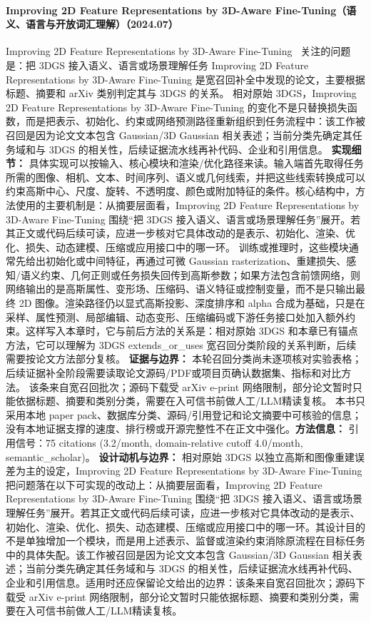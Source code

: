 \paragraph{Improving 2D Feature Representations by 3D-Aware Fine-Tuning（语义、语言与开放词汇理解）（2024.07）}
Improving 2D Feature Representations by 3D-Aware Fine-Tuning~\cite{2407_20229} 关注的问题是：把 3DGS 接入语义、语言或场景理解任务 Improving 2D Feature Representations by 3D-Aware Fine-Tuning 是宽召回补全中发现的论文，主要根据标题、摘要和 arXiv 类别判定其与 3DGS 的关系。
相对原始 3DGS，Improving 2D Feature Representations by 3D-Aware Fine-Tuning 的变化不是只替换损失函数，而是把表示、初始化、约束或网络预测路径重新组织到任务流程中：该工作被召回是因为论文文本包含 Gaussian/3D Gaussian 相关表述；当前分类先确定其任务域和与 3DGS 的相关性，后续证据流水线再补代码、企业和引用信息。
\textbf{实现细节：} 具体实现可以按输入、核心模块和渲染/优化路径来读。输入端首先取得任务所需的图像、相机、文本、时间序列、语义或几何线索，并把这些线索转换成可以约束高斯中心、尺度、旋转、不透明度、颜色或附加特征的条件。核心结构中，方法使用的主要机制是：从摘要层面看，Improving 2D Feature Representations by 3D-Aware Fine-Tuning 围绕“把 3DGS 接入语义、语言或场景理解任务”展开。若其正文或代码后续可读，应进一步核对它具体改动的是表示、初始化、渲染、优化、损失、动态建模、压缩或应用接口中的哪一环。 训练或推理时，这些模块通常先给出初始化或中间特征，再通过可微 Gaussian rasterization、重建损失、感知/语义约束、几何正则或任务损失回传到高斯参数；如果方法包含前馈网络，则网络输出的是高斯属性、变形场、压缩码、语义特征或控制变量，而不是只输出最终 2D 图像。渲染路径仍以显式高斯投影、深度排序和 alpha 合成为基础，只是在采样、属性预测、局部编辑、动态变形、压缩编码或下游任务接口处加入额外约束。这样写入本章时，它与前后方法的关系是：相对原始 3DGS 和本章已有锚点方法，它可以理解为 3DGS extends\_or\_uses 宽召回分类阶段的关系判断，后续需要按论文方法部分复核。
\textbf{证据与边界：} 本轮召回分类尚未逐项核对实验表格；后续证据补全阶段需要读取论文源码/PDF或项目页确认数据集、指标和对比方法。 该条来自宽召回批次；源码下载受 arXiv e-print 网络限制，部分论文暂时只能依据标题、摘要和类别分类，需要在入可信书前做人工/LLM精读复核。 本书只采用本地 paper pack、数据库分类、源码/引用登记和论文摘要中可核验的信息；没有本地证据支撑的速度、排行榜或开源完整性不在正文中强化。\textbf{方法信息：} 引用信号：75 citations (3.2/month, domain-relative cutoff 4.0/month, semantic\_scholar)。
\textbf{设计动机与边界：} 相对原始 3DGS 以独立高斯和图像重建误差为主的设定，Improving 2D Feature Representations by 3D-Aware Fine-Tuning 把问题落在以下可实现的改动上：从摘要层面看，Improving 2D Feature Representations by 3D-Aware Fine-Tuning 围绕“把 3DGS 接入语义、语言或场景理解任务”展开。若其正文或代码后续可读，应进一步核对它具体改动的是表示、初始化、渲染、优化、损失、动态建模、压缩或应用接口中的哪一环。其设计目的不是单独增加一个模块，而是用上述表示、监督或渲染约束消除原流程在目标任务中的具体失配。该工作被召回是因为论文文本包含 Gaussian/3D Gaussian 相关表述；当前分类先确定其任务域和与 3DGS 的相关性，后续证据流水线再补代码、企业和引用信息。适用时还应保留论文给出的边界：该条来自宽召回批次；源码下载受 arXiv e-print 网络限制，部分论文暂时只能依据标题、摘要和类别分类，需要在入可信书前做人工/LLM精读复核。
